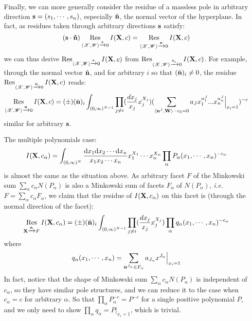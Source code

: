 \documentclass[12pt]{article}
\theoremstyle{definition}
\theoremstyle{plain}
\begin{document}
Finally, we can more generally consider the residue of a massless pole in arbitrary direction ${\bf s}=(s_1,\cdots,s_n)$, especially $\hat{\bf n}$, the normal vector of the hyperplane.  In fact, as residues taken through arbitrary directions ${\bf s}$ satisfy:
\begin{equation}
({\bf s\cdot \hat {n}})\operatorname*{Res}_{\langle {\mathscr X}, {\mathscr W}\rangle\xrightarrow{{\bf s}}0}I({\bf X},c)=\operatorname*{Res}_{\langle {\mathscr X}, {\mathscr W}\rangle\xrightarrow{\hat{\bf n}}0}I({\bf X},c)
\end{equation} 
we can thus derive $\operatorname*{Res}_{\langle {\mathscr X}, {\mathscr W}\rangle\xrightarrow{{\bf s}}0}I({\bf X},c)$ from $\operatorname*{Res}_{\langle {\mathscr X}, {\mathscr W}\rangle\xrightarrow{{\bf t}_i}0}I({\bf X},c)$. For example, through the normal vector $\hat{\bf n}$, and for arbitrary $i$ so that $(\hat {\bf n})_i\neq0$, the residue $\operatorname*{Res}_{\langle {\mathscr X}, {\mathscr W}\rangle\xrightarrow{\hat{\bf n}}0}I({\bf X},c)$ reads:
\begin{equation}
\operatorname*{Res}_{\langle {\mathscr X}, {\mathscr W}\rangle\xrightarrow{\hat{\bf n}}0}I({\bf X},c)=(\pm)(\hat {\bf n})_i\int_{(0,\infty)^{N-1}}\prod_{j\neq i}(\frac{dx_j}{x_j}x_j^{X_j})(\sum_{\langle{\bf n}^J,{\bf W}\rangle-c_0=0} a_J x_1^{n^J_1}...x_n^{n^J_n}\Big|_{x_i=1})^{-c}
\end{equation}
similar for arbitrary ${\bf s}$.

The multiple polynomials case:
\begin{equation}
I({\bf X},c_{\alpha})=\int_{(0,\infty)^N}\frac{{\text d} x_1{\text d}x_2\cdots{\text d}x_n}{x_1x_2\cdots x_n}x_1^{X_1}\cdots x_n^{X_n}\prod_{\alpha} P_\alpha(x_1,\cdots,x_n)^{-c_{\alpha}}
\end{equation}
is almost the same as the situation above. As arbitrary facet $F$ of the Minkowski sum $\sum_{\alpha}c_{\alpha}N(P_{\alpha})$ is also a Minkowski sum of facets $F_\alpha$ of $N(P_{\alpha})$, {\it i.e.} $F=\sum_{\alpha}c_{\alpha}F_\alpha$, we claim that the residue of $I({\bf X},c_{\alpha})$  on this facet is (through the normal direction of the facet):
\begin{equation}
\operatorname*{Res}_{{\bf X}\xrightarrow{\hat{\bf n}}F}I({\bf X},c_\alpha)=(\pm)(\hat {\bf n})_i\int_{(0,\infty)^{N-1}}\prod_{j\neq i}(\frac{dx_j}{x_j}x_j^{X_j})\prod_{\alpha} q_\alpha(x_1,\cdots,x_n)^{-c_{\alpha}}
\end{equation}
where
\begin{equation}
q_\alpha(x_1,\cdots,x_n)=\sum_{{\bf n}^{J_\alpha}\in F_{\alpha}}a_{J_\alpha}x^{J_\alpha}\Big|_{x_i=1}
\end{equation}
In fact, notice that the shape of Minkowski sum  $\sum_{\alpha}c_{\alpha}N(P_{\alpha})$ is independent of $c_\alpha$, so they have similar pole structures, and we can reduce it to the case when $c_\alpha=c$ for arbitrary $\alpha$. So that $\prod_\alpha P_\alpha^{-c}=P^{-c}$ for a single positive polynomial $P$, and we only need to show $\prod_{\alpha} q_\alpha=P\Big|_{x_i=1}$, which is trivial.
\end{document}
